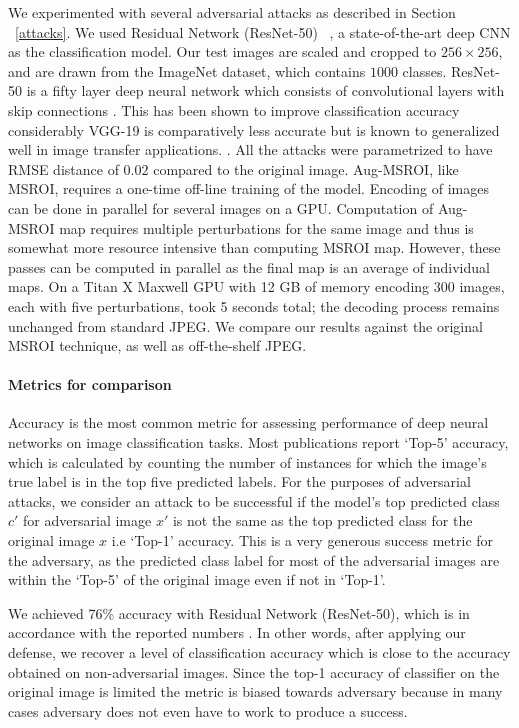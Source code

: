 We experimented with several adversarial attacks as described in Section ~\ref{attacks}.
We used Residual Network (ResNet-50) ~\cite{he2015deep}, a state-of-the-art deep CNN as the classification model. 
Our test images are scaled and cropped to $256 \times 256$, and are drawn from the ImageNet dataset, which contains $1000$ classes.
ResNet-50 is a fifty layer deep neural network which consists of convolutional layers with skip connections \cite{he2015deep}.
This has been shown to improve classification accuracy considerably \cite{He2016IdentityMI}
VGG-19 is comparatively less accurate but is known to generalized well in image transfer applications. \cite{Simonyan2014VeryDC}.
All the attacks were parametrized to have RMSE distance of $0.02$ compared to the original image.
Aug-MSROI, like MSROI, requires a one-time off-line training of the model. Encoding of images can be done in parallel for several images on a GPU. Computation of Aug-MSROI map requires multiple perturbations for the same image and thus is somewhat more resource intensive than computing MSROI map. However, these passes can be computed in parallel as the final map is an average of individual maps. On a Titan X Maxwell GPU with 12 GB of memory encoding 300 images, each with five perturbations, took 5 seconds total; the decoding process remains unchanged from standard JPEG.
We compare our results against the original MSROI technique, as well as off-the-shelf JPEG. 

\paragraph{Metrics for comparison} Accuracy is the most common metric for assessing performance of deep neural networks on image classification tasks.
Most publications report `Top-5' accuracy, which is calculated by counting the number of instances for which the image's true label is in the top five predicted labels. 
For the purposes of adversarial attacks, we consider an attack to be successful if the model's top predicted class $c'$ for adversarial image $x'$ is not the same as the top predicted class for the original image $x$ i.e `Top-1' accuracy. 
This is a very generous success metric for the adversary, as the predicted class label for most of the adversarial images are within the `Top-5' of the original image even if not in `Top-1'.

We achieved 76\% accuracy with Residual Network (ResNet-50), which is in accordance with the reported numbers \cite{he2015deep}.
In other words, after applying our defense, we recover a level of classification accuracy which is close to the accuracy obtained on non-adversarial images.
Since the top-1 accuracy of classifier on the original image is limited the metric is biased towards adversary because in many cases adversary does not even have to work to produce a success.


